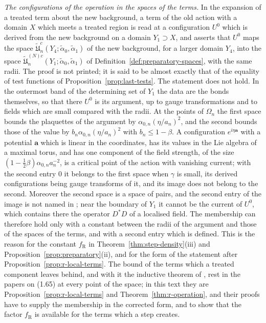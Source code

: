 \documentclass[11pt]{preprint}
\numberwithin{equation}{section}
\begin{document}
\emph{The configurations of the operation in the spaces of the terms.} In the expansion of a treated term about the new background, a term of the old action with a domain $X$ which meets a treated region is read at a configuration $U^0$ which is derived from the new background on a domain $Y_1 \supset X$, and \cite[(1.65), p.~375]{BalabanLFR2} asserts that $U^0$ maps the space $\tilde{\mathfrak U}^c_n(Y_4; \tilde\alpha_0, \tilde\alpha_1)$ of the new background, for a larger domain $Y_4$, into the space $\tilde{\mathfrak U}^{(N)c}_n(Y_1; \tilde\alpha_0, \tilde\alpha_1)$ of Definition~\ref{def:preparatory-spaces}, with the same radii. The proof is not printed; it is said to be almost exactly that of the equality of test functions of Proposition~\ref{prop:last-tests}. The statement does not hold. In the outermost band of the determining set of $Y_1$ the data are the bonds themselves, so that there $U^0$ is its argument, up to gauge transformations and to fields which are small compared with the radii. At the points of $\Omega_n$ the first space bounds the plaquettes of the argument by $\alpha_{0,n}(\eta/a_n)^2$, and the second bounds those of the value by $b_n\alpha_{0,n}(\eta/a_n)^2$ with $b_n \leqslant 1 - \beta$. A configuration $e^{i\eta\mathbf a}$ with a potential $\mathbf a$ which is linear in the coordinates, has its values in the Lie algebra of a maximal torus, and has one component of the field strength, of the size $(1 - \frac{1}{2}\beta)\alpha_{0,n}a_n^{-2}$, is a critical point of the action with vanishing current; with the second entry $0$ it belongs to the first space when $\gamma$ is small, its derived configurations being gauge transforms of it, and its image does not belong to the second. Moreover the second space is a space of pairs, and the second entry of the image is not named in \cite{BalabanLFR2}; near the boundary of $Y_1$ it cannot be the current of $U^0$, which contains there the operator $D^*D$ of a localised field. The membership can therefore hold only with a constant between the radii of the argument and those of the spaces of the terms, and with a second entry which is defined. This is the reason for the constant $f_{\mathrm R}$ in Theorem~\ref{thm:step-density}(iii) and Proposition~\ref{prop:preparatory}(ii), and for the form of the statement after Proposition~\ref{prop:r-local-terms}. The bound \cite[(1.68), p.~377]{BalabanLFR2} of the terms which a treated component leaves behind, and with it the inductive theorem of \cite{BalabanLFR2}, rest in the papers on (1.65) at every point of the space; in this text they are Proposition~\ref{prop:r-local-terms} and Theorem~\ref{thm:r-operation}, and their proofs have to supply the membership in the corrected form, and to show that the factor $f_{\mathrm R}$ is available for the terms which a step creates.
\end{document}

